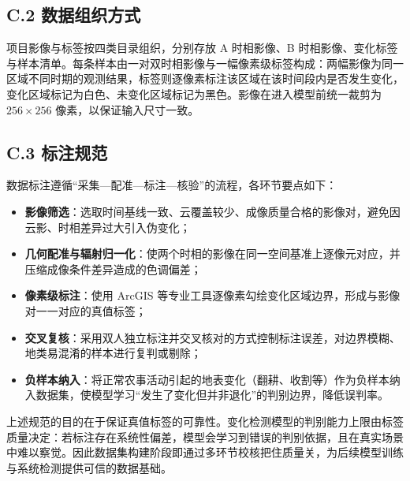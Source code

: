 \documentclass[12pt, a4paper]{ctexart}
\begin{document}
\subsection{C.2 数据组织方式}

项目影像与标签按四类目录组织，分别存放 A 时相影像、B 时相影像、变化标签与样本清单。每条样本由一对双时相影像与一幅像素级标签构成：两幅影像为同一区域不同时期的观测结果，标签则逐像素标注该区域在该时间段内是否发生变化，变化区域标记为白色、未变化区域标记为黑色。影像在进入模型前统一裁剪为 $256 \times 256$ 像素，以保证输入尺寸一致。

\subsection{C.3 标注规范}

数据标注遵循“采集—配准—标注—核验”的流程，各环节要点如下：

\begin{itemize}
    \item \textbf{影像筛选}：选取时间基线一致、云覆盖较少、成像质量合格的影像对，避免因云影、时相差异过大引入伪变化；
    \item \textbf{几何配准与辐射归一化}：使两个时相的影像在同一空间基准上逐像元对应，并压缩成像条件差异造成的色调偏差；
    \item \textbf{像素级标注}：使用 ArcGIS 等专业工具逐像素勾绘变化区域边界，形成与影像对一一对应的真值标签；
    \item \textbf{交叉复核}：采用双人独立标注并交叉核对的方式控制标注误差，对边界模糊、地类易混淆的样本进行复判或剔除；
    \item \textbf{负样本纳入}：将正常农事活动引起的地表变化（翻耕、收割等）作为负样本纳入数据集，使模型学习“发生了变化但并非退化”的判别边界，降低误判率。
\end{itemize}

上述规范的目的在于保证真值标签的可靠性。变化检测模型的判别能力上限由标签质量决定：若标注存在系统性偏差，模型会学习到错误的判别依据，且在真实场景中难以察觉。因此数据集构建阶段即通过多环节校核把住质量关，为后续模型训练与系统检测提供可信的数据基础。
\end{document}
